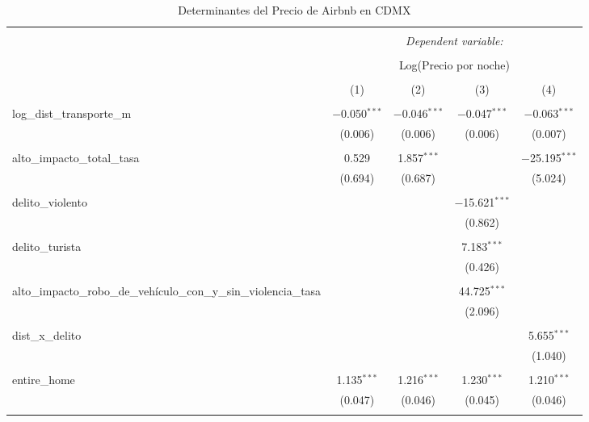 
\begin{table}[!htbp] \centering 
  \caption{Determinantes del Precio de Airbnb en CDMX} 
  \label{} 
\begin{tabular}{@{\extracolsep{5pt}}lcccc} 
\\[-1.8ex]\hline 
\hline \\[-1.8ex] 
 & \multicolumn{4}{c}{\textit{Dependent variable:}} \\ 
\cline{2-5} 
\\[-1.8ex] & \multicolumn{4}{c}{Log(Precio por noche)} \\ 
\\[-1.8ex] & (1) & (2) & (3) & (4)\\ 
\hline \\[-1.8ex] 
 log\_dist\_transporte\_m & $-$0.050$^{***}$ & $-$0.046$^{***}$ & $-$0.047$^{***}$ & $-$0.063$^{***}$ \\ 
  & (0.006) & (0.006) & (0.006) & (0.007) \\ 
  & & & & \\ 
 alto\_impacto\_total\_tasa & 0.529 & 1.857$^{***}$ &  & $-$25.195$^{***}$ \\ 
  & (0.694) & (0.687) &  & (5.024) \\ 
  & & & & \\ 
 delito\_violento &  &  & $-$15.621$^{***}$ &  \\ 
  &  &  & (0.862) &  \\ 
  & & & & \\ 
 delito\_turista &  &  & 7.183$^{***}$ &  \\ 
  &  &  & (0.426) &  \\ 
  & & & & \\ 
 alto\_impacto\_robo\_de\_vehículo\_con\_y\_sin\_violencia\_tasa &  &  & 44.725$^{***}$ &  \\ 
  &  &  & (2.096) &  \\ 
  & & & & \\ 
 dist\_x\_delito &  &  &  & 5.655$^{***}$ \\ 
  &  &  &  & (1.040) \\ 
  & & & & \\ 
 entire\_home & 1.135$^{***}$ & 1.216$^{***}$ & 1.230$^{***}$ & 1.210$^{***}$ \\ 
  & (0.047) & (0.046) & (0.045) & (0.046) \\ 
  & & & & \\ 

\end{tabular}
\end{table}
